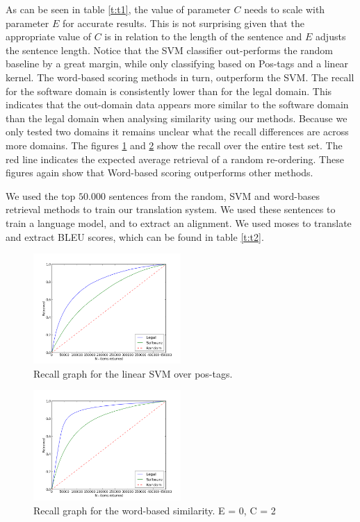 \documentclass[11pt]{article}
\begin{document}
As can be seen in table \ref{t:t1}, the value of parameter $C$ needs to scale with parameter $E$ for accurate results. This is not surprising given that the appropriate value of $C$ is in relation to the length of the sentence and $E$ adjusts the sentence length. Notice that the SVM classifier out-performs the random baseline by a great margin, while only classifying based on Pos-tags and a linear kernel. The word-based scoring methods in turn, outperform the SVM.
The recall for the software domain is consistently lower than for the legal domain. This indicates that the out-domain data appears more similar to the software domain than the legal domain when analysing similarity using our methods. Because we only tested two domains it remains unclear what the recall differences are across more domains.
The figures \ref{fig:results1} and \ref{fig:results2} show the recall over the entire test set. The red line indicates the expected average retrieval of a random re-ordering. These figures again show that Word-based scoring outperforms other methods.

We used the top $50.000$ sentences from the random, SVM and word-bases retrieval methods to train our translation system. We used these sentences to train a language model, and to extract an alignment. We used moses to translate and extract BLEU scores, which can be found in table \ref{t:t2}.

\begin{figure}[h]
  \centering
    \includegraphics[width=0.5\textwidth]{SVM}
  \caption{Recall graph for the linear SVM over pos-tags.}
  \label{fig:results1}
\end{figure}

\begin{figure}[H]
  \centering
    \includegraphics[width=0.5\textwidth]{wbs_0_2}
  \caption{Recall graph for the word-based similarity. E = 0, C = 2}
\label{fig:results2}
\end{figure}
\end{document}
